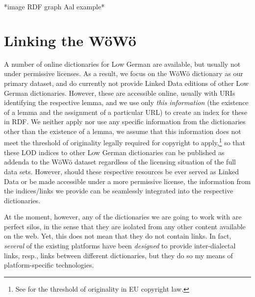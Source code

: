 \documentclass{article}
\begin{document}
*image RDF graph Aal example*

\section{Linking the WöWö}

A number of online dictionaries for Low German are available, but usually not under permissive licenses. As a result, we focus on the WöWö dictionary as our primary dataset, and do currently not provide Linked Data editions of other Low German dictionaries. However, these are accessible online, usually with URIs identifying the respective lemma, and we use only \emph{this information} (the existence of a lemma and the assignment of a particular URL) to create an index for these in RDF. We neither apply nor use any specific information from the dictionaries other than the existence of a lemma, we assume that this information does not meet the threshold of originality legally required for copyright to apply,\footnote{See \citet{Margoni2016} for the threshold of originality in EU copyright law.}
so that these LOD indices to other Low German dictionaries can be published as addenda to the WöWö dataset regardless of the licensing situation of the full data sets. However, should these respective resources be ever served as Linked Data or be made accessible under a more permissive license, the information from the indices/links we provide can be seamlessly integrated into the respective dictionaries.

At the moment, however, any of the dictionaries we are going to work with are perfect silos, in the sense that they are isolated from any other content available on the web. Yet, this does not mean that they do not contain links. In fact, \emph{several} of the existing platforms have been \emph{designed} to provide inter-dialectal links, resp., links between different dictionaries, but they do so my means of platform-specific technologies. 
\end{document}
